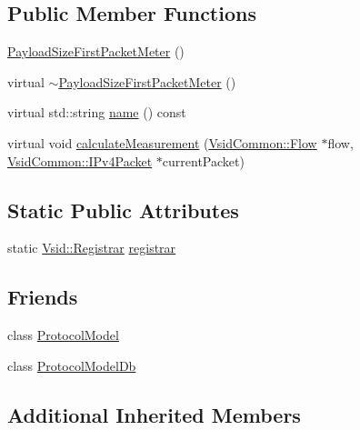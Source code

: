 \subsection*{Public Member Functions}
\begin{DoxyCompactItemize}
\item 
\hyperlink{class_vsid_1_1_payload_size_first_packet_meter_aca2bb1b6f755c8e38fd5734e983629d1}{Payload\-Size\-First\-Packet\-Meter} ()
\item 
virtual \hyperlink{class_vsid_1_1_payload_size_first_packet_meter_ad8bd0180b85b96f876ddc1c8f3270279}{$\sim$\-Payload\-Size\-First\-Packet\-Meter} ()
\item 
virtual std\-::string \hyperlink{class_vsid_1_1_payload_size_first_packet_meter_ae0cea8c8ac9d99246ccca54330ee3897}{name} () const 
\item 
virtual void \hyperlink{class_vsid_1_1_payload_size_first_packet_meter_a3e20bc06d7a06de0b9c1cdf5ab6ff880}{calculate\-Measurement} (\hyperlink{class_vsid_common_1_1_flow}{Vsid\-Common\-::\-Flow} $\ast$flow, \hyperlink{class_vsid_common_1_1_i_pv4_packet}{Vsid\-Common\-::\-I\-Pv4\-Packet} $\ast$current\-Packet)
\end{DoxyCompactItemize}
\subsection*{Static Public Attributes}
\begin{DoxyCompactItemize}
\item 
static \hyperlink{class_vsid_1_1_registrar}{Vsid\-::\-Registrar} \hyperlink{class_vsid_1_1_payload_size_first_packet_meter_af1a8cae3939b909b1c4b99d73d21f319}{registrar}
\end{DoxyCompactItemize}
\subsection*{Friends}
\begin{DoxyCompactItemize}
\item 
class \hyperlink{class_vsid_1_1_payload_size_first_packet_meter_a80219b863d4ff3456933d16bc5f73f45}{Protocol\-Model}
\item 
class \hyperlink{class_vsid_1_1_payload_size_first_packet_meter_a3c0d389e7a9476b06313d8fb9ca9fe68}{Protocol\-Model\-Db}
\end{DoxyCompactItemize}
\subsection*{Additional Inherited Members}


